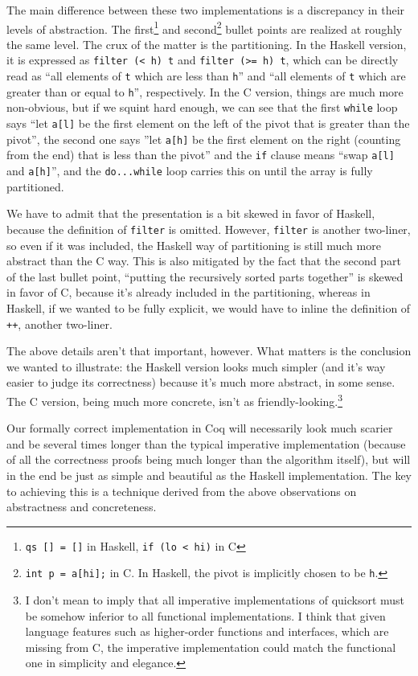 \documentclass[declaration,mgr,english,shortabstract]{iithesis}
\newcommand{\m}[1]{\texttt{#1}}
\begin{document}
The main difference between these two implementations is a discrepancy in their levels of abstraction. The first\footnote{\m{qs\ []\ =\ []} in Haskell, \m{if\ (lo\ <\ hi)} in C} and second\footnote{\m{int\ p\ =\ a[hi];} in C. In Haskell, the pivot is implicitly chosen to be \m{h}.} bullet points are realized at roughly the same level. The crux of the matter is the partitioning. In the Haskell version, it is expressed as \m{filter (< h) t} and \m{filter (>= h) t}, which can be directly read as ``all elements of \m{t} which are less than \m{h}'' and ``all elements of \m{t} which are greater than or equal to \m{h}'', respectively. In the C version, things are much more non-obvious, but if we squint hard enough, we can see that the first \m{while} loop says ``let \m{a[l]} be the first element on the left of the pivot that is greater than the pivot'', the second one says ''let \m{a[h]} be the first element on the right (counting from the end) that is less than the pivot'' and the \m{if} clause means ``swap \m{a[l]} and \m{a[h]}'', and the \m{do...while} loop carries this on until the array is fully partitioned.

We have to admit that the presentation is a bit skewed in favor of Haskell, because the definition of \m{filter} is omitted. However, \m{filter} is another two-liner, so even if it was included, the Haskell way of partitioning is still much more abstract than the C way. This is also mitigated by the fact that the second part of the last bullet point, ``putting the recursively sorted parts together'' is skewed in favor of C, because it's already included in the partitioning, whereas in Haskell, if we wanted to be fully explicit, we would have to inline the definition of \m{++}, another two-liner.

The above details aren't that important, however. What matters is the conclusion we wanted to illustrate: the Haskell version looks much simpler (and it's way easier to judge its correctness) because it's much more abstract, in some sense. The C version, being much more concrete, isn't as friendly-looking.\footnote{I don't mean to imply that all imperative implementations of quicksort must be somehow inferior to all functional implementations. I think that given language features such as higher-order functions and interfaces, which are missing from C, the imperative implementation could match the functional one in simplicity and elegance.}

Our formally correct implementation in Coq will necessarily look much scarier and be several times longer than the typical imperative implementation (because of all the correctness proofs being much longer than the algorithm itself), but will in the end be just as simple and beautiful as the Haskell implementation. The key to achieving this is a technique derived from the above observations on abstractness and concreteness.
\end{document}
